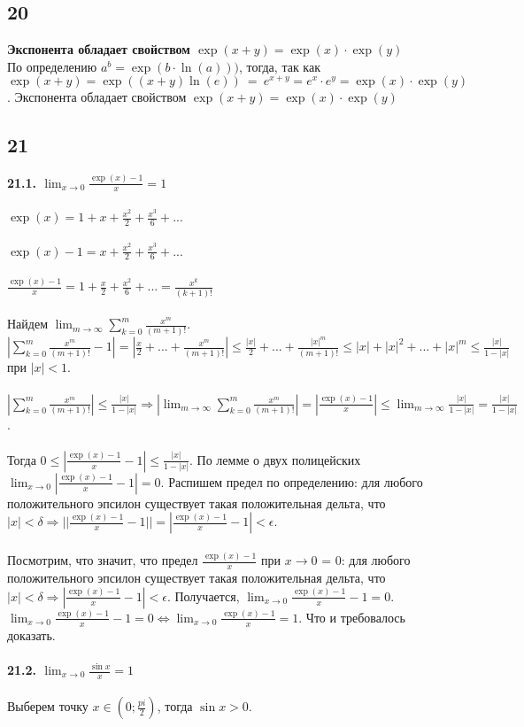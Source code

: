 		\subsection{20}
		\textbf{Экспонента обладает свойством $\exp(x + y) = \exp(x) \cdot \exp(y)$}
		\\
		По определению $a^b = \exp(b \cdot \ln (a)))$, тогда, так как $\exp(x + y) = \exp((x + y) \ln (e))\ = \ e^{x + y} = e^x \cdot e^y = \exp(x) \cdot \exp(y)$. 
		Экспонента обладает свойством $\exp(x + y) = \exp(x) \cdot \exp(y)$
	
		
		\subsection{21}
		\textbf{21.1. $\lim_{x \to 0} \frac{\exp(x) - 1}{x} = 1$}\\
		\\
		$\exp(x) = 1 + x + \frac{x^2}{2} + \frac{x^3}{6} + ...$\\
		\\
		$\exp(x) - 1 = x + \frac{x^2}{2} + \frac{x^3}{6} + ...$\\
		\\
		$\frac{\exp(x) - 1}{x} = 1 + \frac{x}{2} + \frac{x^2}{6} + ... = \frac{x^k}{(k + 1)!}$\\
		\\
		Найдем $\lim_{m \to \infty} \sum_{k = 0}^m \frac{x^m}{(m + 1)!}$. $|\sum_{k = 0}^m \frac{x^m}{(m + 1)!} - 1| = |\frac{x}{2} + ... + \frac{x^m}{(m + 1)!}| \leq \frac{|x|}{2} + ... + \frac{|x|^m}{(m + 1)!} \leq |x| + |x|^{2} + ... + |x|^{m} \leq \frac{|x|}{1 - |x|}$ при $|x| < 1$. \\
		\\
		$|\sum_{k = 0}^m \frac{x^m}{(m + 1)!}| \leq \frac{|x|}{1 - |x|} \Rightarrow |\lim_{m \to \infty} \sum_{k = 0}^m \frac{x^m}{(m + 1)!}| = |\frac{\exp(x) - 1}{x}| \leq \lim_{m \to \infty} \frac{|x|}{1 - |x|} = \frac{|x|}{1 - |x|}$. \\
		\\
		Тогда $0 \leq |\frac{\exp(x) - 1}{x} - 1| \leq \frac{|x|}{1 - |x|}$. По лемме о двух полицейских $\lim_{x \to 0} |\frac{\exp(x) - 1}{x} - 1| = 0$. Распишем предел по определению: для любого положительного эпсилон существует такая положительная дельта, что $|x| < \delta \Rightarrow ||\frac{\exp(x) - 1}{x} - 1|| = |\frac{\exp(x) - 1}{x} - 1| < \epsilon$. \\
		\\
		Посмотрим, что значит, что предел $\frac{\exp(x) - 1}{x}$ при $x \rightarrow 0$ = 0: для любого положительного эпсилон существует такая положительная дельта, что $|x| < \delta \Rightarrow |\frac{\exp(x) - 1}{x} - 1| < \epsilon$. Получается, $\lim_{x \to 0} \frac{\exp(x) - 1}{x} - 1 = 0$. $\lim_{x \to 0} \frac{\exp(x) - 1}{x} - 1 = 0 \Leftrightarrow \lim_{x \to 0} \frac{\exp(x) - 1}{x} = 1$. Что и требовалось доказать. \\
		\\
		\textbf{21.2. $\lim_{x\to 0} \frac{\sin x}{x} = 1$}\\
		\\
		Выберем точку $x \in (0; \frac{pi}{2})$, тогда $\sin x > 0$. \\
		
